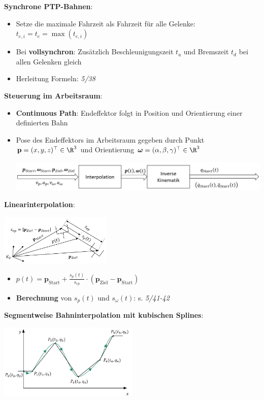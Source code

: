 \bigskip
\textbf{Synchrone PTP-Bahnen}:
\begin{itemize}
	\item Setze die maximale Fahrzeit als Fahrzeit für alle Gelenke:
	$t_{e,i}=t_e=\max(t_{e,i})$
	\item Bei \textbf{vollsynchron}: Zusätzlich Beschleunigungszeit $t_a$ und Bremszeit $t_d$ bei allen Gelenken gleich
	\item Herleitung Formeln: \textit{5/38}
\end{itemize}
\bigskip
\textbf{Steuerung im Arbeitsraum}:
\begin{itemize}
	\item \textbf{Continuous Path}: Endeffektor folgt in Position und Orientierung einer definierten Bahn
	\item Pose des Endeffektors im Arbeitsraum gegeben durch Punkt $\mathbf{p}=(x,y,z)^\top\in\R^3$ und Orientierung $\boldsymbol{\omega}=(\alpha,\beta,\gamma)^\top\in\R^3$
	\begin{center}
		\includegraphics[width=\textwidth]{images/arbeitsraum.png}
	\end{center}
\end{itemize}
\bigskip
\textbf{Linearinterpolation}:
\begin{center}
	\includegraphics[width=0.4\textwidth]{images/lin.png}
\end{center}
\begin{itemize}
	\item $p(t)=\mathbf{p}_\text{Start}+\frac{s_p(t)}{s_{ep}}\cdot (\mathbf{p}_\text{Ziel}-\mathbf{p}_\text{Start})$
	\item \textbf{Berechnung} von $s_p(t)$ und $s_\omega(t)$: s. \textit{5/41-42}
\end{itemize}
\bigskip
\textbf{Segmentweise Bahninterpolation mit kubischen Splines}:
\begin{center}
	\includegraphics[width=0.5\textwidth]{images/splines.png}
\end{center}

